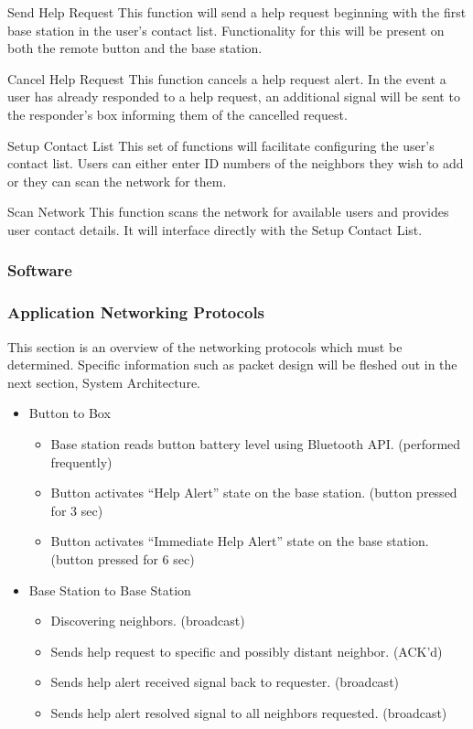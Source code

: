 \documentclass[journal,compsoc]{IEEEtran}
\begin{document}
\begin{LaTeXdescription}
\item[Send Help Request] This function will send a help request beginning with the first base station in the user’s contact list. Functionality for this will be present on both the remote button and the base station.\\
\item[Cancel Help Request] This function cancels a help request alert. In the event a user has already responded to a help request, an additional signal will be sent to the responder’s box informing them of the cancelled request.\\
\item[Setup Contact List] This set of functions will facilitate configuring the user’s contact list.  Users can either enter ID numbers of the neighbors they wish to add or they can scan the network for them.\\
\item[Scan Network] This function scans the network for available users and provides user contact details. It will interface directly with the Setup Contact List.
\end{LaTeXdescription}

\subsubsection{Software}

\subsubsection{Application Networking Protocols}

This section is an overview of the networking protocols which must be determined.  Specific information such as packet design will be fleshed out in the next section, System Architecture.

\begin{itemize}
  \item Button to Box
    \begin{itemize}
      \item Base station reads button battery level using Bluetooth API. (performed frequently)
      \item Button activates “Help Alert” state on the base station. (button pressed for 3 sec)
      \item Button activates “Immediate Help Alert” state on the base station. (button pressed for 6 sec)
    \end{itemize}
  \item Base Station to Base Station
    \begin{itemize}
      \item Discovering neighbors. (broadcast)
      \item Sends help request to specific and possibly distant neighbor. (ACK’d)
      \item Sends help alert received signal back to requester. (broadcast)
      \item Sends help alert resolved signal to all neighbors requested. (broadcast)
    \end{itemize}
\end{itemize}
\end{document}
